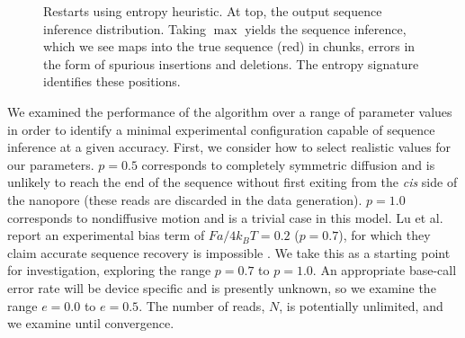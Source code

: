 \documentclass{biophys_letter}
\begin{document}
\begin{figure}
  \caption{Restarts using entropy heuristic. At top, the output sequence inference distribution. Taking $\max$ yields the sequence inference, which we see maps into the true sequence (red) in chunks, errors in the form of spurious insertions and deletions. The entropy signature identifies these positions.}
\label{fig:inference_output}
\end{figure}

We examined the performance of the algorithm over a range of parameter values in order to identify a minimal experimental configuration capable of sequence inference at a given accuracy.
First, we consider how to select realistic values for our parameters.
$p=0.5$ corresponds to completely symmetric diffusion and is unlikely to reach the end of the sequence without first exiting from the {\it cis} side of the nanopore (these reads are discarded in the data generation).
$p=1.0$ corresponds to nondiffusive motion and is a trivial case in this model.
Lu et al. report an experimental bias term of $Fa/4k_{B}T=0.2$ ($p=0.7$), for which they claim accurate sequence recovery is impossible \cite{Lu:2011}.
We take this as a starting point for investigation, exploring the range $p=0.7$ to $p=1.0$.
An appropriate base-call error rate will be device specific and is presently unknown, so we examine the range $e=0.0$ to $e=0.5$.
The number of reads, $N$, is potentially unlimited, and we examine until convergence.
\end{document}
